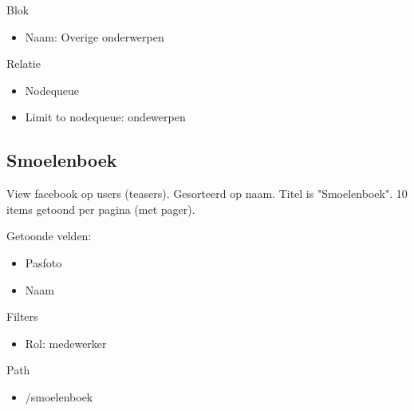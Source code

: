 Blok
\begin{itemize}
\item Naam: Overige onderwerpen
\end{itemize}

Relatie
\begin{itemize}
\item Nodequeue
\item Limit to nodequeue: ondewerpen
\end{itemize}

\subsection{Smoelenboek}
View facebook op users (teasers). Gesorteerd op naam. Titel is "Smoelenboek". 10 items getoond per pagina (met pager).

Getoonde velden: 
\begin{itemize}
\item Pasfoto
\item Naam
\end{itemize}

Filters
\begin{itemize}
\item Rol: medewerker
\end{itemize}

Path
\begin{itemize}
\item /smoelenboek
\end{itemize}
